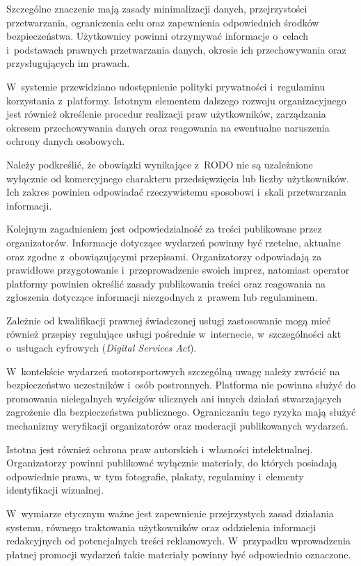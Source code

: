 \documentclass{sprz}
\begin{document}
Szczególne znaczenie mają zasady minimalizacji danych, przejrzystości przetwarzania, ograniczenia celu oraz zapewnienia odpowiednich środków bezpieczeństwa. Użytkownicy powinni otrzymywać informacje o~celach i~podstawach prawnych przetwarzania danych, okresie ich przechowywania oraz przysługujących im prawach.

W~systemie przewidziano udostępnienie polityki prywatności i~regulaminu korzystania z~platformy. Istotnym elementem dalszego rozwoju organizacyjnego jest również określenie procedur realizacji praw użytkowników, zarządzania okresem przechowywania danych oraz reagowania na ewentualne naruszenia ochrony danych osobowych.

Należy podkreślić, że obowiązki wynikające z~RODO nie są uzależnione wyłącznie od komercyjnego charakteru przedsięwzięcia lub liczby użytkowników. Ich zakres powinien odpowiadać rzeczywistemu sposobowi i~skali przetwarzania informacji.

Kolejnym zagadnieniem jest odpowiedzialność za treści publikowane przez organizatorów. Informacje dotyczące wydarzeń powinny być rzetelne, aktualne oraz zgodne z~obowiązującymi przepisami. Organizatorzy odpowiadają za prawidłowe przygotowanie i~przeprowadzenie swoich imprez, natomiast operator platformy powinien określić zasady publikowania treści oraz reagowania na zgłoszenia dotyczące informacji niezgodnych z~prawem lub regulaminem.

Zależnie od kwalifikacji prawnej świadczonej usługi zastosowanie mogą mieć również przepisy regulujące usługi pośrednie w~internecie, w~szczególności akt o~usługach cyfrowych (\emph{Digital Services Act}).

W~kontekście wydarzeń motorsportowych szczególną uwagę należy zwrócić na bezpieczeństwo uczestników i~osób postronnych. Platforma nie powinna służyć do promowania nielegalnych wyścigów ulicznych ani innych działań stwarzających zagrożenie dla bezpieczeństwa publicznego. Ograniczaniu tego ryzyka mają służyć mechanizmy weryfikacji organizatorów oraz moderacji publikowanych wydarzeń.

Istotna jest również ochrona praw autorskich i~własności intelektualnej. Organizatorzy powinni publikować wyłącznie materiały, do których posiadają odpowiednie prawa, w~tym fotografie, plakaty, regulaminy i~elementy identyfikacji wizualnej.

W~wymiarze etycznym ważne jest zapewnienie przejrzystych zasad działania systemu, równego traktowania użytkowników oraz oddzielenia informacji redakcyjnych od potencjalnych treści reklamowych. W~przypadku wprowadzenia płatnej promocji wydarzeń takie materiały powinny być odpowiednio oznaczone.
\end{document}
